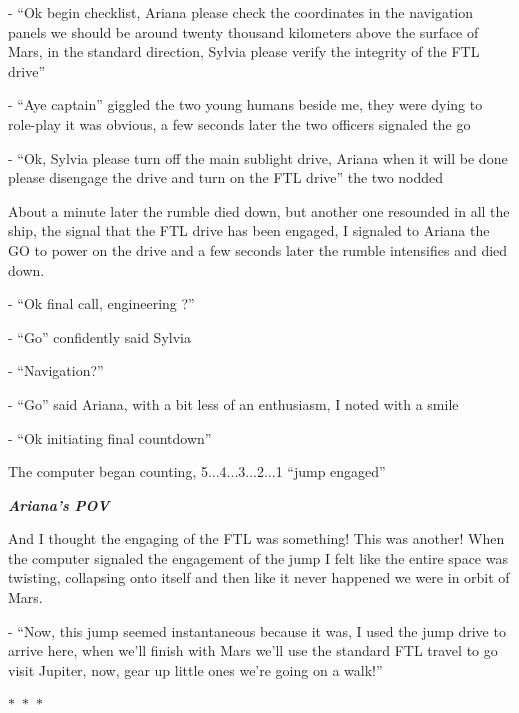 \documentclass[colorlinks,12pt,a4paper]{book}
\newcommand\sep{\begin{center}
  \boldmath $\ast$~$\ast$~$\ast$
\end{center}}
\begin{document}
- “Ok begin checklist, Ariana please check the coordinates in the navigation panels we should be around twenty 
thousand kilometers above the surface of Mars, in the standard direction, 
Sylvia please verify the integrity of the FTL drive”\par
\bigskip

- “Aye captain” giggled the two young humans beside me, they were dying to role-play it was obvious, 
a few seconds later the two officers signaled the go\par
\bigskip

- “Ok, Sylvia please turn off the main sublight drive, Ariana when it will be done please disengage the 
drive and turn on the FTL drive” the two nodded\par
\bigskip

About a minute later the rumble died down, but another one resounded in all the ship, the signal that the 
FTL drive has been engaged, I signaled to Ariana the GO to power on the drive and a few seconds later the 
rumble intensifies and died down. \par
\bigskip

- “Ok final call, engineering ?”\par
\bigskip
- “Go” confidently said Sylvia\par
\bigskip
- “Navigation?”\par
\bigskip
- “Go” said Ariana, with a bit less of an enthusiasm, I noted with a smile\par
\bigskip
- “Ok initiating final countdown”\par
\bigskip

The computer began counting, 5...4...3...2...1 “jump engaged”\par
\bigskip

\textit{\textbf{Ariana's POV}}\par
\bigskip

And I thought the engaging of the FTL was something! This was another! 
When the computer signaled the engagement of the jump I felt like the entire space was twisting, 
collapsing onto itself and then like it never happened we were in orbit of Mars.\par
\bigskip

- “Now, this jump seemed instantaneous because it was, I used the jump drive to arrive here, 
when we'll finish with Mars we'll use the standard FTL travel to go visit Jupiter, 
now, gear up little ones we're going on a walk!”

\sep
\end{document}
